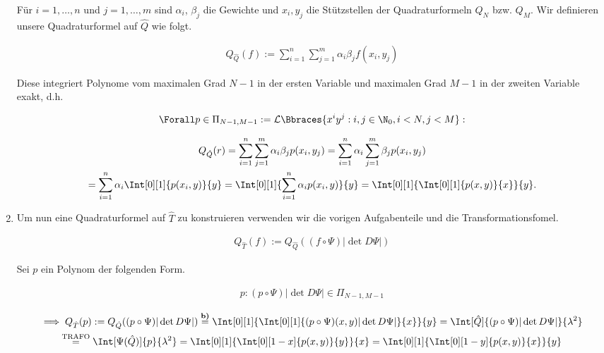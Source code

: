 \begin{solution}
\begin{enumerate}[label = \textbf{\alph*)}]
    Für $i = 1, \dots, n$ und $j = 1, \dots, m$ sind $\alpha_i$, $\beta_j$ die Gewichte und $x_i, y_j$ die Stützstellen der Quadraturformeln $Q_N$ bzw. $Q_M$.
    Wir definieren unsere Quadraturformel auf $\hat Q$ wie folgt.
  
    \begin{align*}
      Q_{\hat Q}(f)
      :=
      \sum_{i=1}^n
      \sum_{j=1}^m
      \alpha_i \beta_j
      f(x_i, y_j)
    \end{align*}
  
    Diese integriert Polynome vom maximalen Grad $N - 1$ in der ersten Variable und maximalen Grad $M - 1$ in der zweiten Variable exakt, d.h.
  
    \begin{align*}
      \Forall p \in \Pi_{N - 1, M - 1}
      :=
      \mathcal{L}
      \Bbraces{x^i y^j: i, j \in \N_0, i < N, j < M}:
    \end{align*}
  
    \begin{multline*}
      Q_{\hat Q}(r)
      =
      \sum_{i=1}^n
      \sum_{j=1}^m
      \alpha_i \beta_j
      p(x_i, y_j)
      =
      \sum_{i=1}^n
      \alpha_i
      \sum_{j=1}^m
      \beta_j
      p(x_i, y_j) \\
      =
      \sum_{i=1}^n
      \alpha_i
      \Int[0][1]{p(x_i, y)}{y}
      =
      \Int[0][1]
      {
        \sum_{i=1}^n
        \alpha_i
        p(x_i, y)
      }{y}
      =
      \Int[0][1]
      {
        \Int[0][1]{p(x, y)}{x}
      }{y}.
    \end{multline*}
  
    \item Um nun eine Quadraturformel auf $\hat T$ zu konstruieren verwenden wir die vorigen Aufgabenteile und die Transformationsfomel.
  
    \begin{align*}
      Q_{\hat T}(f)
      :=
      Q_{\hat Q}((f \circ \Psi) |\det D \Psi|)
    \end{align*}
  
    Sei $p$ ein Polynom der folgenden Form.
  
    \begin{align*}
      p: (p \circ \Psi) |\det D \Psi| \in \Pi_{N - 1, M - 1}
    \end{align*}
  
    \begin{multline*}
      \implies
      Q_{\hat T}(p)
      :=
      Q_{\hat Q}((p\circ \Psi) |\det D \Psi|)
      \stackrel
      {
        \textbf{b)}
      }{=}
      \Int[0][1]
      {
        \Int[0][1]
        {
          (p \circ \Psi)(x, y)
          |\det D \Psi|
        }{x}
      }{y}
      =
      \Int[\hat Q]
      {
        (p \circ \Psi)
        |\det D \Psi|
      }{\lambda^2} \\
      \stackrel
      {
        \mathrm{TRAFO}
      }{=}
      \Int[\Psi(\hat Q)]{p}{\lambda^2}
      =
      \Int[0][1]
      {
        \Int[0][1 - x]{p(x, y)}{y}
      }{x}
      =
      \Int[0][1]
      {
        \Int[0][1 - y]{p(x, y)}{x}
      }{y}
      \end{multline*}
  

\end{enumerate}
\end{solution}
